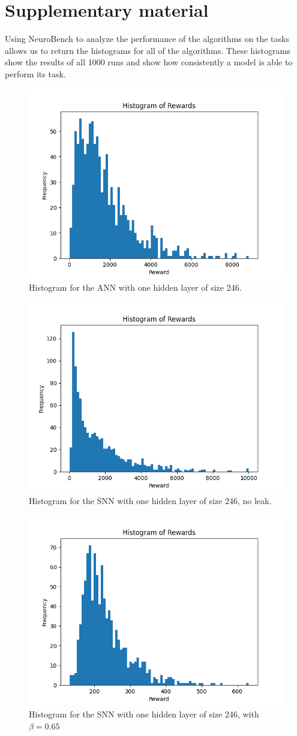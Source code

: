 \newpage

\section{Supplementary material}
Using NeuroBench to analyze the performance of the algorithms on the tasks allows us to return the histograms for all of the algorithms. These histograms show the results of all 1000 runs and show how consistently a model is able to perform its task.
\begin{figure}[h]
    \centering
    \includegraphics[width = .45\textwidth]{Figures/ANN_histogram1K.png}
    \caption{Histogram for the ANN with one hidden layer of size 246.}
    \label{fig:enter-label}
\end{figure}

\begin{figure}[h]
    \centering
    \includegraphics[width = .45\textwidth]{Figures/SNN_histogram1K_noLeak.png}
    \caption{Histogram for the SNN with one hidden layer of size 246, no leak.}
    \label{fig:enter-label}
\end{figure}

\begin{figure}[h]
    \centering
    \includegraphics[width = .45\textwidth]{Figures/SNN_histogram1K_higher_leaks.png}
    \caption{Histogram for the SNN with one hidden layer of size 246, with $\beta=0.65$}
    \label{fig:enter-label}
\end{figure}